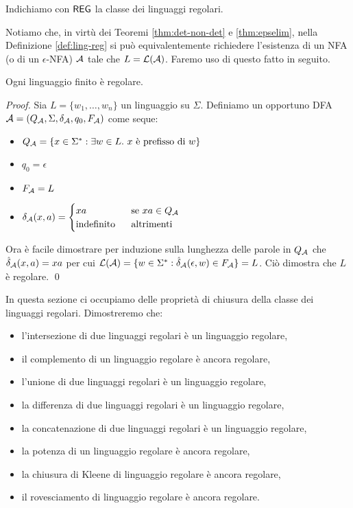 \documentclass[runningheads,a4paper]{llncs}
\begin{document}
Indichiamo con $\mathsf{REG}$ la classe dei linguaggi regolari.

Notiamo che, in virt\`{u} dei Teoremi \ref{thm:det-non-det} e \ref{thm:epselim}, nella Definizione \ref{def:ling-reg} si pu\`{o} equivalentemente richiedere l'esistenza di un NFA (o di un $\epsilon$-NFA) $\mathcal{A}$ tale che $L = \mathcal{L}(\mathcal{A})$. Faremo uso di questo fatto in seguito.

\begin{theorem}\label{thm:fin-reg}
Ogni linguaggio finito \`{e} regolare.
\end{theorem}

\begin{proof}
Sia $L = \{w_1,\ldots,w_n\}$ un linguaggio su $\Sigma$. Definiamo un opportuno DFA $\mathcal{A} = (Q_{\mathcal{A}},\Sigma,\delta_{\mathcal{A}},q_0,F_{\mathcal{A}})$ come seque:
\begin{itemize}
\item $Q_{\mathcal{A}} = \{x \in \Sigma^* : \exists w \in L.\ x \mbox{ \`{e} prefisso di } w \}$
\item $q_0 = \epsilon$
\item $F_{\mathcal{A}} = L$
\item $\delta_{\mathcal{A}}(x,a) = 
\begin{cases}
xa & \mbox{ se } xa \in Q_{\mathcal{A}} \\
\mbox{indefinito } & \mbox{ altrimenti } \\
\end{cases}$
\end{itemize}
Ora \`{e} facile dimostrare per induzione sulla lunghezza delle parole in $Q_{\mathcal{A}}$ che $\hat{\delta}_{\mathcal{A}}(x,a) = xa$ per cui $\mathcal{L}(\mathcal{A}) = \{w \in \Sigma^* : \hat{\delta}_{\mathcal{A}}(\epsilon,w) \in F_{\mathcal{A}}\} = L$. Ci\`{o} dimostra che $L$ \`{e} regolare.
\qed\end{proof}

In questa sezione ci occupiamo delle propriet\`{a} di chiusura della classe dei linguaggi regolari. Dimostreremo che:
\begin{itemize}
\item l'intersezione di due linguaggi regolari \`{e} un linguaggio regolare,
\item il complemento di un linguaggio regolare \`{e} ancora regolare,
\item l'unione di due linguaggi regolari \`{e} un linguaggio regolare,
\item la differenza di due linguaggi regolari \`{e} un linguaggio regolare,
\item la concatenazione di due linguaggi regolari \`{e} un linguaggio regolare,
\item la potenza di un linguaggio regolare \`{e} ancora regolare,
\item la chiusura di Kleene di linguaggio regolare \`{e} ancora regolare,
\item il rovesciamento di linguaggio regolare \`{e} ancora regolare.
\end{itemize}
\end{document}
